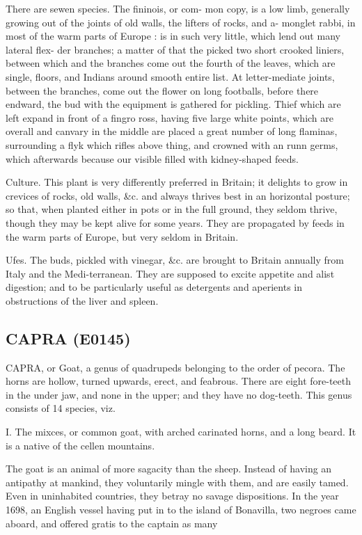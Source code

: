 \documentclass{article}
\begin{document}
There are sewen species. The fininois, or com- mon copy, is a low limb, generally growing out of the joints of old walls, the lifters of rocks, and a- monglet rabbi, in most of the warm parts of Europe : is in such very little, which lend out many lateral flex- der branches; a matter of that the picked two short crooked liniers, between which and the branches come out the fourth of the leaves, which are single, floors, and Indians around smooth entire list. At letter-mediate joints, between the branches, come out the flower on long footballs, before there endward, the bud with the equipment is gathered for pickling. Thief which are left expand in front of a fingro ross, having five large white points, which are overall and canvary in the middle are placed a great number of long flaminas, surrounding a flyk which rifles above thing, and crowned with an runn germs, which afterwards because our visible filled with kidney-shaped feeds.

Culture. This plant is very differently preferred in Britain; it delights to grow in crevices of rocks, old walls, \&c. and always thrives best in an horizontal posture; so that, when planted either in pots or in the full ground, they seldom thrive, though they may be kept alive for some years. They are propagated by feeds in the warm parts of Europe, but very seldom in Britain.

Ufes. The buds, pickled with vinegar, \&c. are brought to Britain annually from Italy and the Medi-terranean. They are supposed to excite appetite and alist digestion; and to be particularly useful as detergents and aperients in obstructions of the liver and spleen.

\subsection*{CAPRA (E0145)}
CAPRA, or Goat, a genus of quadrupeds belonging to the order of pecora. The horns are hollow, turned upwards, erect, and feabrous. There are eight fore-teeth in the under jaw, and none in the upper; and they have no dog-teeth. This genus consists of 14 species, viz.

I. The mixces, or common goat, with arched carinated horns, and a long beard. It is a native of the cellen mountains.

The goat is an animal of more sagacity than the sheep. Instead of having an antipathy at mankind, they voluntarily mingle with them, and are easily tamed. Even in uninhabited countries, they betray no savage dispositions. In the year 1698, an English vessel having put in to the island of Bonavilla, two negroes came aboard, and offered gratis to the captain as many
\end{document}
